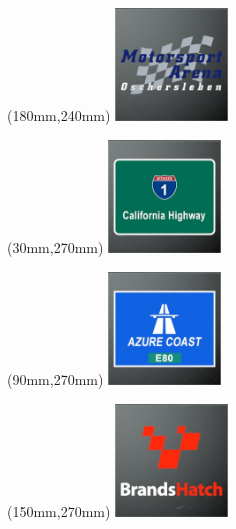 \begin{textblock*}{30mm}(180mm,240mm)%
\includegraphics[width=30mm]{LG/2015-05-20_00090.png}
\end{textblock*}
\begin{textblock*}{30mm}(30mm,270mm)%
\includegraphics[width=30mm]{LG/2015-05-20_00077.png}
\end{textblock*}
\begin{textblock*}{30mm}(90mm,270mm)%
\includegraphics[width=30mm]{LG/2015-05-20_00073.png}
\end{textblock*}
\begin{textblock*}{30mm}(150mm,270mm)%
\includegraphics[width=30mm]{LG/2015-05-20_00074.png}
\end{textblock*}
